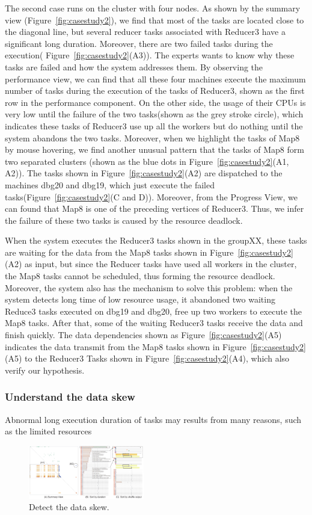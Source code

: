 The second case runs on the cluster with four nodes. As shown by the summary view (Figure~\ref{fig:casestudy2}), we find that most of the tasks are located close to the diagonal line, but several reducer tasks associated with Reducer3 have a significant long duration.
Moreover, there are two failed tasks during the execution( Figure~\ref{fig:casestudy2}(A3)). The experts wants to know why these tasks are failed and how the system addresses them. By observing the performance view, we can find that all these four machines execute the maximum number of tasks during the execution of the tasks of Reducer3, shown as the first row in the performance component. 
On the other side, the usage of their CPUs is very low until the failure of the two tasks(shown as the grey stroke circle), which indicates these tasks of Reducer3 use up all the workers but do nothing until the system abandons the two tasks. Moreover, when we highlight the tasks of Map8 by mouse hovering, we find another unusual pattern that the tasks of Map8 form two separated clusters (shown as the blue dots in Figure~\ref{fig:casestudy2}(A1, A2)).  
The tasks shown in Figure~\ref{fig:casestudy2}(A2) are dispatched to the machines dbg20 and dbg19, which just execute the failed tasks(Figure~\ref{fig:casestudy2}(C and D)). Moreover, from the Progress View, we can found that Map8 is one of the preceding vertices of Reducer3. Thus, we infer the failure of these two tasks is caused by the resource deadlock. 

When the system executes the Reducer3 tasks shown in the groupXX, these tasks are waiting for the data from the Map8 tasks shown in Figure~\ref{fig:casestudy2}(A2) as input, but since the Reducer tasks have used all workers in the cluster, the Map8 tasks cannot be scheduled, thus forming the resource deadlock. 
Moreover, the system also has the mechanism to solve this problem: when the system detects long time  of low resource usage, it abandoned two waiting Reduce3 tasks executed on dbg19 and dbg20, free up two workers to execute the Map8 tasks. After that, some of the waiting Reducer3 tasks receive the data and finish quickly. The data dependencies shown as Figure~\ref{fig:casestudy2}(A5) indicates the data transmit from the Map8 tasks shown in Figure~\ref{fig:casestudy2}(A5) to the Reducer3 Tasks shown in Figure~\ref{fig:casestudy2}(A4), which also verify our hypothesis.

\subsubsection{Understand the data skew}
Abnormal long execution duration of tasks may results from many reasons, such as the limited resources 


\begin{figure}[t]
	\centering
	\includegraphics[width=0.45\textwidth]{figures/case_study/CaseStudy3.pdf}
	\vspace{-3mm}
	\caption{Detect the data skew.}
	\label{fig:casestudy3}
	\vspace{-3mm}
\end{figure}

